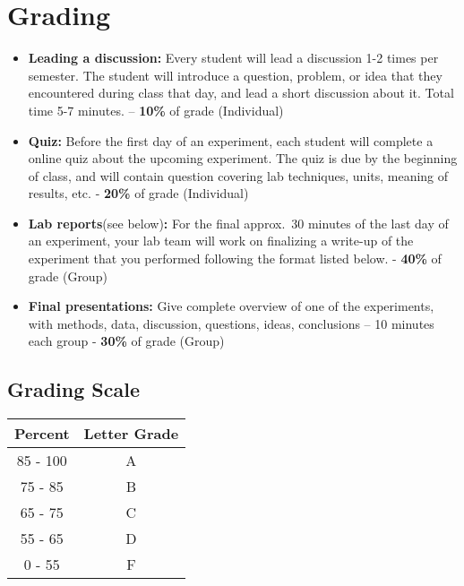 \newpage

\section*{Grading}
\begin{itemize}
\itemsep0em
\item \textbf{Leading a discussion:} Every student will lead a discussion 1-2 times per semester. The student will introduce a question, problem, or idea that they encountered during class that day, and lead a short discussion about it. Total time 5-7 minutes. \newline – \textbf{10\%} of grade (Individual)
\item \textbf{Quiz:}  Before the first day of an experiment, each student will complete a online quiz about the upcoming experiment. The quiz is due by the beginning of class, and will contain question covering lab techniques, units, meaning of results, etc. \newline - \textbf{20\%} of grade (Individual)
\item \textbf{Lab reports}(see below)\textbf{:} For the final approx.\ 30 minutes of the last day of an experiment, your lab team will work on finalizing a write-up of the experiment that you performed following the format listed below. \newline - \textbf{40\%} of grade (Group)
\item \textbf{Final presentations:} Give complete overview of one of the experiments, with methods, data, discussion, questions, ideas, conclusions – 10 minutes each group \newline - \textbf{30\%} of grade (Group)
\end{itemize}

\subsection*{Grading Scale}
\begin{table}[ht]
\centering
\begin{tabular}{|c|c|}
\hline 
\rule[-1ex]{0pt}{2.5ex} Percent & Letter Grade \\ 
\hline 
\rule[-1ex]{0pt}{2.5ex} 85 - 100 & A \\ 
\hline 
\rule[-1ex]{0pt}{2.5ex} 75 - 85 & B \\ 
\hline 
\rule[-1ex]{0pt}{2.5ex} 65 - 75 & C \\ 
\hline 
\rule[-1ex]{0pt}{2.5ex} 55 - 65 & D \\ 
\hline 
\rule[-1ex]{0pt}{2.5ex} 0 - 55 & F \\ 
\hline 
\end{tabular}
\end{table}

